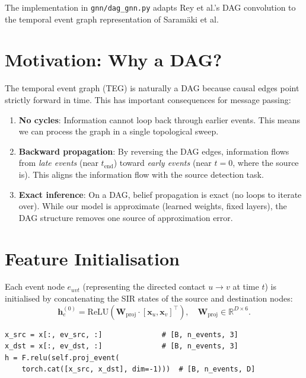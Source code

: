 \documentclass[12pt,a4paper]{report}
\newcommand{\R}{\mathbb{R}}
\newcommand{\bh}{\mathbf{h}}
\newcommand{\bx}{\mathbf{x}}
\newcommand{\bW}{\mathbf{W}}
\begin{document}
The implementation in \texttt{gnn/dag\_gnn.py} adapts Rey et al.'s DAG
convolution to the temporal event graph representation of Saramäki et al.

\section{Motivation: Why a DAG?}

The temporal event graph (TEG) is naturally a DAG because causal edges point
strictly forward in time. This has important consequences for message passing:

\begin{enumerate}
  \item \textbf{No cycles}: Information cannot loop back through earlier events.
    This means we can process the graph in a single topological sweep.
  \item \textbf{Backward propagation}: By reversing the DAG edges, information
    flows from \emph{late events} (near $t_{\text{end}}$) toward \emph{early
    events} (near $t=0$, where the source is). This aligns the information flow
    with the source detection task.
  \item \textbf{Exact inference}: On a DAG, belief propagation is exact (no
    loops to iterate over). While our model is approximate (learned weights,
    fixed layers), the DAG structure removes one source of approximation error.
\end{enumerate}

\section{Feature Initialisation}

Each event node $e_{uvt}$ (representing the directed contact $u \to v$ at time
$t$) is initialised by concatenating the SIR states of the source and
destination nodes:
\begin{equation}
  \bh_e^{(0)} = \text{ReLU}\!\left(\bW_{\text{proj}} \cdot [\bx_u, \bx_v]^\top\right), \quad \bW_{\text{proj}} \in \R^{D \times 6}.
  \label{eq:dag_init}
\end{equation}

\begin{lstlisting}[caption={DAG-GNN event feature initialisation.}]
x_src = x[:, ev_src, :]              # [B, n_events, 3]
x_dst = x[:, ev_dst, :]              # [B, n_events, 3]
h = F.relu(self.proj_event(
    torch.cat([x_src, x_dst], dim=-1)))  # [B, n_events, D]
\end{lstlisting}
\end{document}

